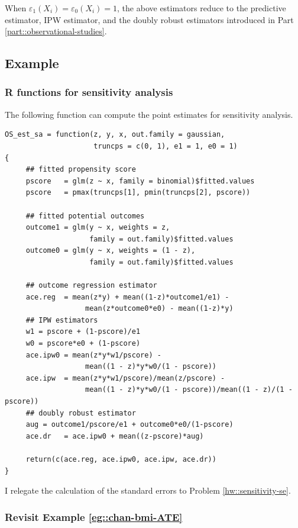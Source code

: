 When $\varepsilon_1(X_i)  =  \varepsilon_0(X_i) = 1$, the above estimators reduce to the predictive estimator, IPW estimator, and the doubly robust estimators introduced in Part \ref{part::observational-studies}. 



\subsection{Example}
\label{sec::eg-sensitivity-tau}


\subsubsection{R functions for sensitivity analysis}


The following  function can compute the point estimates for sensitivity analysis. 

\begin{lstlisting}
OS_est_sa = function(z, y, x, out.family = gaussian, 
                     truncps = c(0, 1), e1 = 1, e0 = 1)
{
     ## fitted propensity score
     pscore   = glm(z ~ x, family = binomial)$fitted.values
     pscore   = pmax(truncps[1], pmin(truncps[2], pscore))
     
     ## fitted potential outcomes
     outcome1 = glm(y ~ x, weights = z, 
                    family = out.family)$fitted.values
     outcome0 = glm(y ~ x, weights = (1 - z), 
                    family = out.family)$fitted.values
     
     ## outcome regression estimator
     ace.reg  = mean(z*y) + mean((1-z)*outcome1/e1) - 
                   mean(z*outcome0*e0) - mean((1-z)*y) 
     ## IPW estimators
     w1 = pscore + (1-pscore)/e1
     w0 = pscore*e0 + (1-pscore)
     ace.ipw0 = mean(z*y*w1/pscore) - 
                   mean((1 - z)*y*w0/(1 - pscore))
     ace.ipw  = mean(z*y*w1/pscore)/mean(z/pscore) - 
                   mean((1 - z)*y*w0/(1 - pscore))/mean((1 - z)/(1 - pscore))
     ## doubly robust estimator
     aug = outcome1/pscore/e1 + outcome0*e0/(1-pscore)
     ace.dr   = ace.ipw0 + mean((z-pscore)*aug)

     return(c(ace.reg, ace.ipw0, ace.ipw, ace.dr))     
}
\end{lstlisting}

I relegate the calculation of the standard errors to Problem \ref{hw::sensitivity-se}. 

\subsubsection{Revisit Example \ref{eg::chan-bmi-ATE}}


